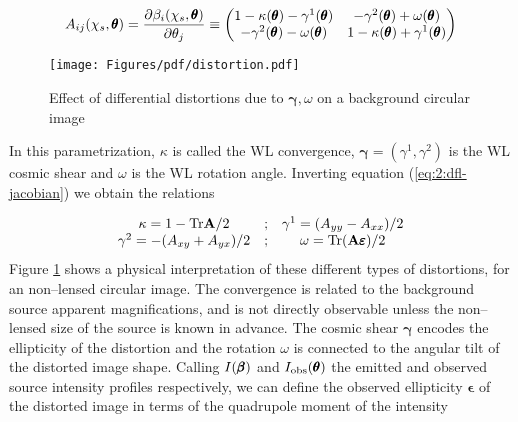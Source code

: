 \begin{equation}
\label{eq:2:dfl-jacobian}
A_{ij}(\chi_s,\pmb{\theta}) = \frac{\partial \beta_i(\chi_s,\pmb{\theta})}{\partial \theta_j} \equiv
\begin{pmatrix}
1-\kappa(\pmb{\theta})-\gamma^1(\pmb{\theta}) & -\gamma^2(\pmb{\theta})+\omega(\pmb{\theta}) \\
-\gamma^2(\pmb{\theta})-\omega(\pmb{\theta}) & 1-\kappa(\pmb{\theta})+\gamma^1(\pmb{\theta})
\end{pmatrix}
\end{equation}  
%
\begin{figure}
\begin{center}
\texttt{[image: Figures/pdf/distortion.pdf]}
\end{center}
\caption{Effect of differential distortions due to $\pmb{\gamma},\omega$ on a background circular image}
\label{fig:2:distortion}
\end{figure}
%
In this parametrization, $\kappa$ is called the WL convergence, $\pmb{\gamma}=(\gamma^1,\gamma^2)$ is the WL cosmic shear and $\omega$ is the WL rotation angle. Inverting equation (\ref{eq:2:dfl-jacobian}) we obtain the relations

\begin{equation}
\label{eq:2:dfl-inverse}
\begin{matrix}
\kappa = 1-{\rm Tr} \mathbf{A}/2 & ; & \gamma^1 = (A_{yy} - A_{xx})/2 \\
\gamma^2 = -(A_{xy}+A_{yx})/2 & ; & \omega = {\rm Tr} (\mathbf{A}\pmb{\varepsilon})/2
\end{matrix}
\end{equation}
% 
Figure \ref{fig:2:distortion} shows a physical interpretation of these different types of distortions, for an non--lensed circular image. The convergence is related to the background source apparent magnifications, and is not directly observable unless the non--lensed size of the source is known in advance. The cosmic shear $\pmb{\gamma}$ encodes the ellipticity of the distortion and the rotation $\omega$ is connected to the angular tilt of the distorted image shape. Calling $I(\pmb{\beta})$ and $I_{\rm obs}(\pmb{\theta})$ the emitted and observed source intensity profiles respectively, we can define the observed ellipticity $\pmb{\epsilon}$ of the distorted image in terms of the quadrupole moment of the intensity 

